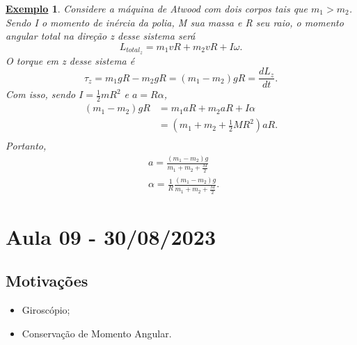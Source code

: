 \documentclass{article}
\newtheorem{example}{\underline{Exemplo}}
\begin{document}
  \begin{example}
    Considere a máquina de Atwood com dois corpos tais que \(m_{1} > m_{2}\). Sendo I o momento de inércia da polia, M sua massa e R seu raio, o momento angular total na direção z desse sistema será 
      \[
        L_{total_z} = m_{1}vR + m_{2}vR + I\omega.
      \]
    O torque em z desse sistema é 
      \[
        \tau_{z} = m_{1}gR - m_{2}gR = (m_{1}-m_{2})gR = \frac{dL_{z}}{dt}.
      \]
    Com isso, sendo \(I = \frac{1}{2}mR^{2}\) e \(a  = R\alpha \),
   \begin{align*}
     (m_{1}-m_{2})gR &= m_{1}aR + m_{2}aR + I\alpha \\
                     &= (m_{1}+m_{2}+\frac{1}{2}MR^{2})aR.\\
   \end{align*}
   Portanto, 
  \begin{align*}
    &a = \frac{(m_{1}-m_{2})g}{m_{1}+m_{2}+\frac{M}{2}}\\
    &\alpha = \frac{1}{R}\frac{(m_{1}-m_{2})g}{m_{1}+m_{2}+\frac{M}{2}}.\
  \end{align*}
  \end{example}
\newpage

\section{Aula 09 - 30/08/2023}
\subsection{Motivações}
\begin{itemize}
  \item Giroscópio;
  \item Conservação de Momento Angular.
\end{itemize}
\end{document}
